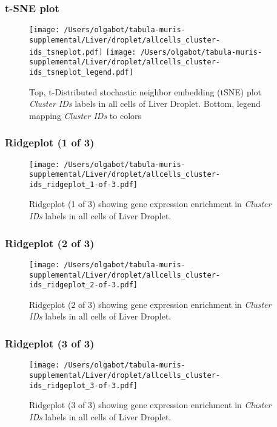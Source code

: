 \clearpage
\subsubsection{t-SNE plot}
\begin{figure}[h]
\centering
\texttt{[image: /Users/olgabot/tabula-muris-supplemental/Liver/droplet/allcells\_cluster-ids\_tsneplot.pdf]}
\texttt{[image: /Users/olgabot/tabula-muris-supplemental/Liver/droplet/allcells\_cluster-ids\_tsneplot\_legend.pdf]}
\caption{Top, t-Distributed stochastic neighbor embedding (tSNE) plot  \emph{Cluster IDs} labels in all cells of Liver Droplet. Bottom, legend mapping \emph{Cluster IDs} to colors}
\end{figure}


\clearpage

\subsubsection{Ridgeplot (1 of 3)}
\begin{figure}[h]
\centering
\texttt{[image: /Users/olgabot/tabula-muris-supplemental/Liver/droplet/allcells\_cluster-ids\_ridgeplot\_1-of-3.pdf]}

\caption{ Ridgeplot (1 of 3)  showing gene expression enrichment in \emph{Cluster IDs} labels in all cells of Liver Droplet. }
\end{figure}


\clearpage

\subsubsection{Ridgeplot (2 of 3)}
\begin{figure}[h]
\centering
\texttt{[image: /Users/olgabot/tabula-muris-supplemental/Liver/droplet/allcells\_cluster-ids\_ridgeplot\_2-of-3.pdf]}

\caption{ Ridgeplot (2 of 3)  showing gene expression enrichment in \emph{Cluster IDs} labels in all cells of Liver Droplet. }
\end{figure}


\clearpage

\subsubsection{Ridgeplot (3 of 3)}
\begin{figure}[h]
\centering
\texttt{[image: /Users/olgabot/tabula-muris-supplemental/Liver/droplet/allcells\_cluster-ids\_ridgeplot\_3-of-3.pdf]}

\caption{ Ridgeplot (3 of 3)  showing gene expression enrichment in \emph{Cluster IDs} labels in all cells of Liver Droplet. }
\end{figure}


